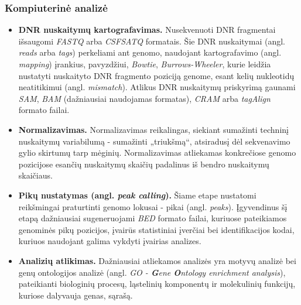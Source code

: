 \documentclass[12pt]{article}
\begin{document}
\subsubsection{Kompiuterinė analizė}
\begin{itemize}
    \item \textbf{DNR nuskaitymų kartografavimas.} Nusekvenuoti DNR 
        fragmentai išsaugomi \emph{FASTQ} arba \emph{CSFSATQ} formatais. Šie DNR
        nuskaitymai (angl. \emph{reads} arba \emph{tags}) perkeliami ant genomo,
        naudojant kartografavimo (angl. \emph{mapping}) įrankius, pavyzdžiui,
        \emph{Bowtie}\cite{ARTICLE6}, \emph{Burrows-Wheeler}, kurie leidžia
        nustatyti nuskaityto DNR fragmento poziciją genome, esant kelių
        nukleotidų neatitikimui\cite{ARTICLE7} (angl. \emph{mismatch}). Atlikus
        DNR nuskaitymų priskyrimą gaunami \emph{SAM}, \emph{BAM} (dažniausiai
        naudojamas formatas), \emph{CRAM} arba \emph{tagAlign} formato failai.
    \item \textbf{Normalizavimas.} Normalizavimas reikalingas, siekiant
        sumažinti techninį nuskaitymų variabilumą - sumažinti „triukšmą“,
        atsiradusį dėl sekvenavimo gylio skirtumų tarp mėginių. Normalizavimas
        atliekamas konkrečiose genomo pozicijose esančių nuskaitymų skaičių
        padalinus iš bendro nuskaitymų skaičiaus\cite{ARTICLE17}.
    \item \textbf{Pikų nustatymas (angl. \emph{peak calling}).} Šiame etape
        nustatomi reikšmingai praturtinti genomo lokusai - pikai
        (angl. \emph{peaks}). Įgyvendinus šį etapą dažniausiai sugeneruojami
        \emph{BED} formato failai\cite{ARTICLE1}, kuriuose pateikiamos genominės
        pikų pozicijos, įvairūs statistiniai įverčiai bei identifikacijos kodai,
        kuriuos naudojant galima vykdyti įvairias analizes.
    \item \textbf{Analizių atlikimas.} Dažniausiai atliekamos analizės yra
        motyvų analizė bei genų ontologijos analizė\cite{ARTICLE1}
        (angl. \emph{GO - \textbf{G}ene \textbf{O}ntology enrichment analysis}),
        pateikianti biologinių procesų, ląstelinių komponentų ir molekulinių
        funkcijų, kuriose dalyvauja genas, sąrašą.
\end{itemize}

\end{document}
